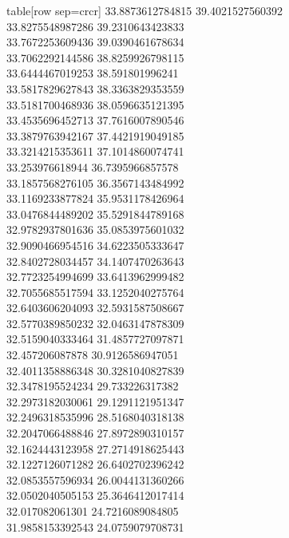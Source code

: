   table[row sep=crcr]{%
33.8873612784815	39.4021527560392\\
33.8275548987286	39.2310643423833\\
33.7672253609436	39.0390461678634\\
33.7062292144586	38.8259926798115\\
33.6444467019253	38.591801996241\\
33.5817829627843	38.3363829353559\\
33.5181700468936	38.0596635121395\\
33.4535696452713	37.7616007890546\\
33.3879763942167	37.4421919049185\\
33.3214215353611	37.1014860074741\\
33.253976618944	36.7395966857578\\
33.1857568276105	36.3567143484992\\
33.1169233877824	35.9531178426964\\
33.0476844489202	35.5291844789168\\
32.9782937801636	35.0853975601032\\
32.9090466954516	34.6223505333647\\
32.8402728034457	34.1407470263643\\
32.7723254994699	33.6413962999482\\
32.7055685517594	33.1252040275764\\
32.6403606204093	32.5931587508667\\
32.5770389850232	32.0463147878309\\
32.5159040333464	31.4857727097871\\
32.457206087878	30.9126586947051\\
32.4011358886348	30.3281040827839\\
32.3478195524234	29.733226317382\\
32.2973182030061	29.1291121951347\\
32.2496318535996	28.5168040318138\\
32.2047066488846	27.8972890310157\\
32.1624443123958	27.2714918625443\\
32.1227126071282	26.6402702396242\\
32.0853557596934	26.0044131360266\\
32.0502040505153	25.3646412017414\\
32.017082061301	24.7216089084805\\
31.9858153392543	24.0759079708731\\
}
